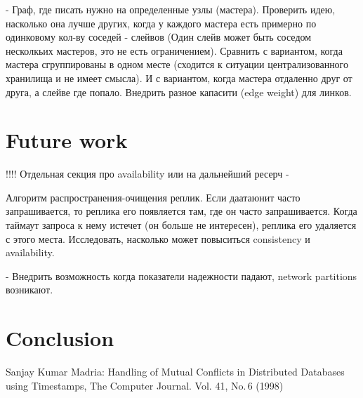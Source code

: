 \documentclass{llncs}
\begin{document}
- Граф, где писать нужно на определенные узлы (мастера). Проверить идею, насколько она лучше других, когда у каждого мастера есть примерно по одинковому кол-ву соседей - слейвов (Один слейв может быть соседом несколкьих мастеров, это не есть ограничением). Сравнить с вариантом, когда мастера сгруппированы в одном месте (сходится к ситуации централизованного хранилища и не имеет смысла). И с вариантом, когда мастера отдаленно друг от друга, а слейве где попало.
Внедрить разное капасити (edge weight) для линков.

\section{Future work}
!!!! Отдельная секция про availability или на дальнейший ресерч -

Алгоритм распространения-очищения реплик. Если даатаюнит часто запрашивается, то реплика его появляется там, где он часто запрашивается. Когда таймаут запроса к нему истечет (он больше не интересен), реплика его удаляется с этого места.
Исследовать, насколько может повыситься consistency и availability. 

- Внедрить возможность когда показатели надежности падают, network partitions возникают.


\section{Conclusion}

\begin{thebibliography}{99}

Sanjay Kumar Madria: 
Handling of Mutual Conflicts in Distributed Databases using Timestamps,
The Computer Journal. Vol. 41, No.\,6 (1998) 

\end{thebibliography}
\end{document}
